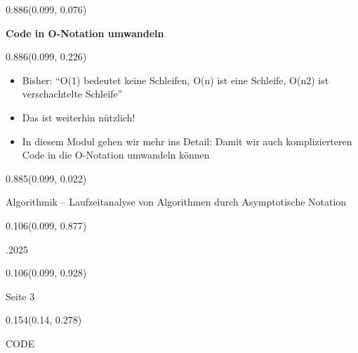 \documentclass[aspectratio=169]{beamer}
\begin{document}
\begin{frame}[fragile]
\begin{textblock}{0.886}(0.099, 0.076)
  \begin{minipage}[t][0.131\paperheight]{\linewidth}
    \textbf{Code in O-Notation umwandeln}
  \end{minipage}
\end{textblock}
\begin{textblock}{0.886}(0.099, 0.226)
  \begin{minipage}[b][0.63\paperheight]{\linewidth}
    {\scriptsize
    \begin{itemize}
      \item Bisher: ``O(1) bedeutet keine Schleifen, O(n) ist eine Schleife, O(n2) ist verschachtelte Schleife''
      \item Das ist weiterhin nützlich!
      \item In diesem Modul gehen wir mehr ins Detail: Damit wir auch komplizierteren Code in die O-Notation umwandeln können
    \end{itemize}
    }
  \end{minipage}
\end{textblock}
\begin{textblock}{0.885}(0.099, 0.022)
  \begin{minipage}[b][0.031\paperheight]{\linewidth}
    \raggedright
    \fontsize{3}{3.3}\selectfont Algorithmik – Laufzeitanalyse von Algorithmen durch Asymptotische Notation
  \end{minipage}
\end{textblock}
\begin{textblock}{0.106}(0.099, 0.877)
  \begin{minipage}[b][0.026\paperheight]{\linewidth}
    \raggedright
    \fontsize{3}{3.3}.2025
  \end{minipage}
\end{textblock}
\begin{textblock}{0.106}(0.099, 0.928)
  \begin{minipage}[b][0.031\paperheight]{\linewidth}
    \raggedright
    \fontsize{3}{3.3}\selectfont Seite 3
  \end{minipage}
\end{textblock}
\begin{textblock}{0.154}(0.14, 0.278)
  \begin{minipage}[t][0.161\paperheight]{\linewidth}
    {\tiny CODE}
  \end{minipage}
\end{textblock}

\end{frame}
\end{document}
